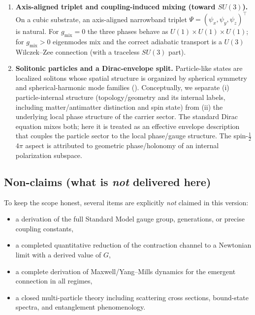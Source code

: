 \begin{enumerate}
\item \textbf{Axis-aligned triplet and coupling-induced mixing (toward $SU(3)$).}
On a cubic substrate, an axis-aligned narrowband triplet $\Psi=(\psi_x,\psi_y,\psi_z)^\top$ is natural.
For $g_{\mathrm{mix}}=0$ the three phases behave as $U(1)\times U(1)\times U(1)$; for $g_{\mathrm{mix}}>0$ eigenmodes mix and the correct
adiabatic transport is a $U(3)$ Wilczek--Zee connection (with a traceless $SU(3)$ part).

\item \textbf{Solitonic particles and a Dirac-envelope split.}
Particle-like states are localized solitons whose spatial structure is organized by spherical symmetry and
spherical-harmonic mode families ().
Conceptually, we separate (i) particle-internal structure (topology/geometry and its internal labels, including
matter/antimatter distinction and spin state) from (ii) the underlying local phase structure of the carrier sector.
The standard Dirac equation mixes both; here it is treated as an effective envelope description that couples the
particle sector to the local phase/gauge structure.
The spin-$\tfrac12$ $4\pi$ aspect is attributed to geometric phase/holonomy of an internal polarization subspace.
\end{enumerate}

\subsection{Non-claims (what is \emph{not} delivered here)}
To keep the scope honest, several items are explicitly \emph{not} claimed in this version:
\begin{itemize}
\item a derivation of the full Standard Model gauge group, generations, or precise coupling constants,
\item a completed quantitative reduction of the contraction channel to a Newtonian limit with a derived value of $G$,
\item a complete derivation of Maxwell/Yang--Mills dynamics for the emergent connection in all regimes,
\item a closed multi-particle theory including scattering cross sections, bound-state spectra, and entanglement
phenomenology.
\end{itemize}


